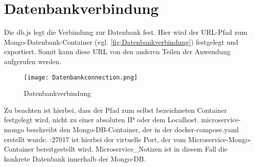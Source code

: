 
\chapter{Datenbankverbindung}
\label{ch:Datenbankverbindung}
Die db.js legt die Verbindung zur Datenbank fest. Hier wird der URL-Pfad zum Mongo-Datenbank-Container (vgl. \autoref{fig:Datenbankverbindung}) festgelegt und exportiert. Somit kann diese URL von den anderen Teilen der Anwendung aufgerufen werden. 

\begin{figure}[h]
\texttt{[image: Datenbankconnection.png]}
\vspace{1pt}
\caption{Datenbankverbindung}
\label{fig:Datenbankverbindung}
\end{figure}

Zu beachten ist hierbei, dass der Pfad zum selbst bezeichneten Container festgelegt wird, nicht zu einer absoluten IP oder dem Localhost. \glqq  microservice-mongo\grqq{} beschreibt den Mongo-DB-Container, der in der \glqq docker-compose.yaml\grqq{} erstellt wurde. \glqq  :27017\grqq{} ist hierbei der virtuelle Port, der vom Microservice-Mongo-Container bereitgestellt wird. \glqq  Microservice\_Notizen\grqq{} ist in diesem Fall die konkrete Datenbank innerhalb der Mongo-DB.


